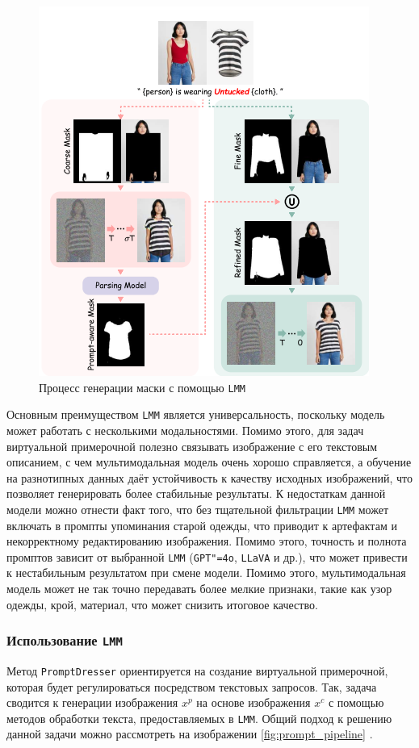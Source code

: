 \begin{figure}[H]
    \centering
    \includegraphics[width=0.75\linewidth]{images/lmm_maskgener.png}
    \caption{Процесс генерации маски с помощью \texttt{LMM}}
    \label{fig:lmm_maskgener}
\end{figure}

Основным преимуществом \texttt{LMM} является универсальность, поскольку модель может работать с несколькими модальностями. Помимо этого, для задач виртуальной примерочной полезно связывать изображение с его текстовым описанием, с чем мультимодальная модель очень хорошо справляется, а обучение на разнотипных данных даёт устойчивость к качеству исходных изображений, что позволяет генерировать более стабильные результаты. К недостаткам данной модели можно отнести факт того, что без тщательной фильтрации \texttt{LMM} может включать в промпты упоминания старой одежды, что приводит к артефактам и некорректному редактированию изображения. Помимо этого, точность и полнота промптов зависит от выбранной \texttt{LMM} (\texttt{GPT"=4o}, \texttt{LLaVA} и др.), что может привести к нестабильным результатом при смене модели. Помимо этого, мультимодальная модель может не так точно передавать более мелкие признаки, такие как узор одежды, крой, материал, что может снизить итоговое качество.

\subsubsection{Использование \texttt{LMM}}
Метод \texttt{PromptDresser} ориентируется на создание виртуальной примерочной, которая будет регулироваться посредством текстовых запросов. Так, задача сводится к генерации изображения $x^p$ на основе изображения $x^c$ с помощью методов обработки текста, предоставляемых в \texttt{LMM}. Общий подход к решению данной задачи можно рассмотреть на изображении \ref{fig:prompt_pipeline} \cite{promptdresser}.

